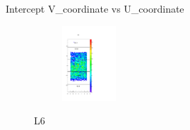 \documentclass[xcolor=dvipsnames]{beamer}
\begin{document}
\begin{frame}{Intercept V\_coordinate vs U\_coordinate}
\begin{multicols}{4}
\begin{figure}[H]
 			\begin{center}				
 				\begin{subfigure}[b]{0.30\textwidth}
 					\includegraphics[width=2cm]{L6uv.pdf}
 				\end{subfigure}		
 				\caption*{L6}		
 			\end{center}
 		\end{figure}
 	\end{multicols}	
 	
 \end{frame}
\end{document}
